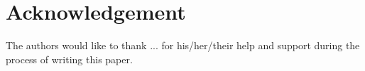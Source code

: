 \section{Acknowledgement}
The authors would like to thank ... for his/her/their help and support during the process of writing this paper.